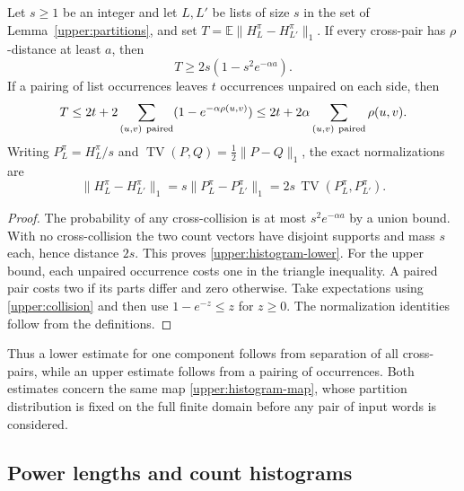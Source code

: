 \begin{lemma}\label{upper:histogram}
Let $s\ge1$ be an integer and let $L,L'$ be lists of size $s$ in the
set of Lemma~\ref{upper:partitions}, and set
$T=\mathbb E\|H_L^\pi-H_{L'}^\pi\|_1$.
If every cross-pair has $\rho$-distance at least $a$, then
\begin{equation}\label{upper:histogram-lower}
 T\ge2s(1-s^2e^{-\alpha a}).
\end{equation}
If a pairing of list occurrences leaves $t$ occurrences unpaired on
each side, then
\begin{equation}\label{upper:coupling}
 T\le2t+2\sum_{(u,v)\ {\rm paired}}(1-e^{-\alpha\rho(u,v)})
   \le2t+2\alpha\sum_{(u,v)\ {\rm paired}}\rho(u,v).
\end{equation}
Writing $P_L^\pi=H_L^\pi/s$ and
$\operatorname{TV}(P,Q)=\tfrac12\|P-Q\|_1$, the exact normalizations are
\begin{equation}\label{upper:normalizations}
 \|H_L^\pi-H_{L'}^\pi\|_1
 =s\|P_L^\pi-P_{L'}^\pi\|_1
 =2s\,\operatorname{TV}(P_L^\pi,P_{L'}^\pi).
\end{equation}
\end{lemma}
\begin{proof}
The probability of any cross-collision is at most $s^2e^{-\alpha a}$
by a union bound.  With no cross-collision the two count vectors have
disjoint supports and mass $s$ each, hence distance $2s$.  This proves
\eqref{upper:histogram-lower}.  For the upper bound, each unpaired
occurrence costs one in the triangle inequality.  A paired pair costs
two if its parts differ and zero otherwise.  Take expectations using
\eqref{upper:collision} and then use $1-e^{-z}\le z$ for $z\ge0$.
The normalization identities follow from the definitions.
\end{proof}

Thus a lower estimate for one component follows from separation of all
cross-pairs, while an upper estimate follows from a pairing of occurrences.
Both estimates concern the same map \eqref{upper:histogram-map}, whose
partition distribution is fixed on the full finite domain before any
pair of input words is considered.

\subsection{Power lengths and count histograms}\label{upper:powers}

